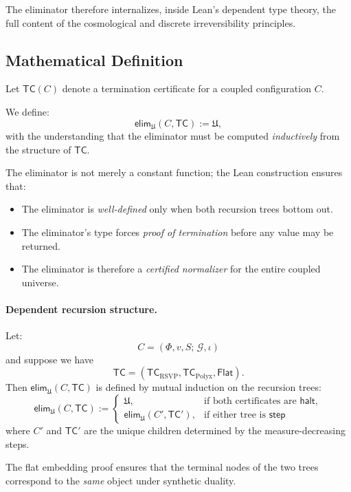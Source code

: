 The eliminator therefore internalizes, inside Lean’s dependent type theory, the full content of the cosmological and discrete irreversibility principles.

\subsection{Mathematical Definition}

Let $\mathsf{TC}(C)$ denote a termination certificate for a coupled configuration $C$.

We define:
\[
   \mathsf{elim}_{\mathfrak{U}}(C, \mathsf{TC})
      := \mathfrak{U},
\]
with the understanding that the eliminator must be computed \emph{inductively} from the structure of $\mathsf{TC}$.

The eliminator is not merely a constant function; the Lean construction ensures that:

\begin{itemize}
\item The eliminator is \emph{well-defined} only when both recursion trees bottom out.
\item The eliminator’s type forces \emph{proof of termination} before any value may be returned.
\item The eliminator is therefore a \emph{certified normalizer} for the entire coupled universe.
\end{itemize}

\paragraph{Dependent recursion structure.}

Let:
\[
   C = (\Phi,v,S;\,\mathcal{G},\iota)
\]
and suppose we have
\[
   \mathsf{TC} = (\mathsf{TC}_{\mathrm{RSVP}},
                  \mathsf{TC}_{\mathrm{Polyx}},
                  \mathsf{Flat}).
\]
Then $\mathsf{elim}_{\mathfrak{U}}(C,\mathsf{TC})$ is defined by mutual induction on the recursion trees:
\[
   \mathsf{elim}_{\mathfrak{U}}(C,\mathsf{TC})
     := \begin{cases}
          \mathfrak{U}, & \text{if both certificates are }\mathsf{halt}, \\[4pt]
          \mathsf{elim}_{\mathfrak{U}}(C',\mathsf{TC'}), & \text{if either tree is }\mathsf{step}
        \end{cases}
\]
where $C'$ and $\mathsf{TC'}$ are the unique children determined by the measure-decreasing steps.

The flat embedding proof ensures that the terminal nodes of the two trees correspond to the \emph{same} object under synthetic duality.

